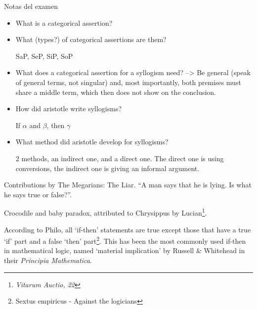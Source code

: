 \documentclass{article}
\newcommand{\cit}[2]{\cite[p.~#1~in~][]{#2}}
\begin{document}

Notas del examen
\begin{itemize}
  \item What is a categorical assertion?

  \item What (types?) of categorical assertions are them?

  SaP, SeP, SiP, SoP
  \item What does a categorical assertion for a syllogism need? --> Be
  general (speak of general terms, not singular) and, most importantly, both
  premises must share a middle term, which then does not show on the
  conclusion.

  \item How did aristotle write syllogisms?

  If \(\alpha\) and \(\beta\), then \(\gamma\)

  \item What method did aristotle develop for syllogisms?

  2 methods, an indirect one, and a direct one. The direct one is using
  conversions, the indirect one is giving an informal argument.

\end{itemize}

\newpage
Contributions by The Megarians:
The Liar. \enquote{A man says that he is lying. Is what he says true or false?}.

Crocodile and baby paradox, attributed to Chrysippus by Lucian\footnote{\textit{Vitarum Auctio, 22}}.

According to Philo, all `if-then' statements are true except those that have
a true `if' part and a false `then' part\footnote{Sextus empiricus - Against
the logicians}. This has been the most commonly used if-then in mathematical
logic, named `material implication' by Russell \& Whitehead in their
\textit{Principia Mathematica}. %
\end{document}

